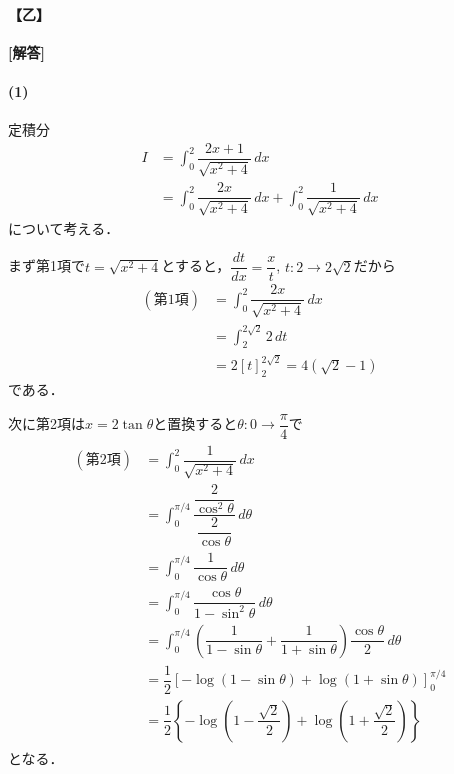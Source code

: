 \documentclass[../../main.tex]{subfiles}
\begin{document}
\begin{oframed}
  
\end{oframed}

\paragraph{【乙】}

{\bf [解答]}

\paragraph{(1)}

定積分
\begin{align}
  I
  & = \int_0^2\dfrac{2x+1}{\sqrt{x^2+4}}\,dx \\
  & = \int_0^2\dfrac{2x}{\sqrt{x^2+4}}\,dx + \int_0^2\dfrac{1}{\sqrt{x^2+4}}\,dx \label{eq:1}
\end{align}
について考える．

まず第1項で$t=\sqrt{x^2+4}$とすると，$\dfrac{dt}{dx}=\dfrac{x}{t}$, $t:2\to 2\sqrt{2}$だから
\begin{align}
  (\text{第1項})
  &= \int_0^2\dfrac{2x}{\sqrt{x^2+4}}\,dx \\
  &= \int_2^{2\sqrt{2}}2\,dt \\
  &= 2[t]_2^{2\sqrt{2}}=4(\sqrt{2}-1) \label{eq:2}
\end{align}
である．

次に第2項は$x=2\tan\theta$と置換すると$\theta:0\to\dfrac{\pi}{4}$で
\begin{align}
  \begin{split}
    (\text{第2項})
    &=\int_0^2\dfrac{1}{\sqrt{x^2+4}}\,dx \\
    &=\int_0^{\pi/4}\dfrac{\dfrac{2}{\cos^2\theta}}{\dfrac{2}{\cos\theta}}\,d\theta\\
    &=\int_0^{\pi/4}\dfrac{1}{\cos\theta}\,d\theta \\
    &=\int_0^{\pi/4}\dfrac{\cos\theta}{1-\sin^2\theta}\,d\theta\\
    &=\int_0^{\pi/4}\left(\dfrac{1}{1-\sin\theta}+\dfrac{1}{1+\sin\theta}\right)
    \dfrac{\cos\theta}{2}\,d\theta\\
    &=\dfrac{1}{2}\left[-\log(1-\sin\theta)+\log(1+\sin\theta)\right]_0^{\pi/4}\\
    &=\dfrac{1}{2}\left\{-\log\left(1-\dfrac{\sqrt{2}}{2}\right)
    +\log\left(1+\dfrac{\sqrt{2}}{2}\right)\right\}
  \end{split}\label{eq:3}
\end{align}
となる．
\end{document}
